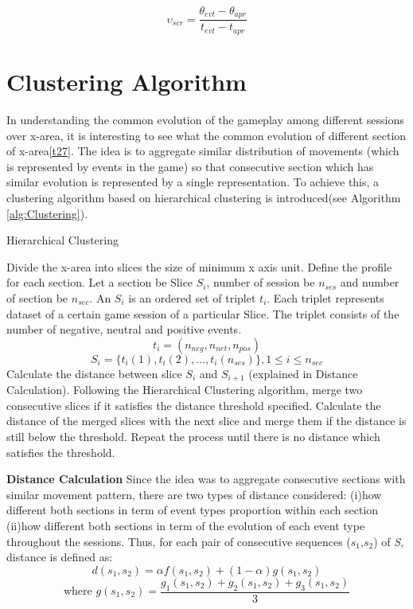 $$ \upsilon_{scr} = \frac{\theta_{evt}-\theta_{apr}}{\textit{t}_{evt}-\textit{t}_{apr}} $$

\section{Clustering Algorithm}

In understanding the common evolution of the gameplay among different sessions over x-area, it is interesting to see what the common evolution of different section of x-area\ref{t27}. The idea is to aggregate similar distribution of movements (which is represented by events in the game) so that consecutive section which has similar evolution is represented by a single representation. To achieve this, a clustering algorithm based on hierarchical clustering is introduced(see Algorithm \ref{alg:Clustering}). 
\begin{algorithm}
  \caption{Hierarchical Clustering}\label{alg:Clustering}
  \begin{algorithmic}[1]
  \STATE Divide the x-area into slices the size of minimum x axis unit.
  \STATE Define the profile for each section. Let a section be Slice $\textit{S}_i$, number of session be $n_{ses}$ and number of section be $n_{sec}$. An $\textit{S}_i$ is an ordered set of triplet $\textit{t}_i$. Each triplet represents dataset of a certain game session of a particular Slice. The triplet consists of the number of negative, neutral and positive events.
$$\textit{t}_i = (n_{neg}, n_{net}, n_{pos})$$
$$\textit{S}_i = \{\textit{t}_i(1), \textit{t}_i(2), ..., \textit{t}_i(n_{ses})\}, 1\le i\le n_{sec}$$
  \STATE Calculate the distance between slice $\textit{S}_i$ and $\textit{S}_{i+1}$ (explained in Distance Calculation).
  \STATE Following the Hierarchical Clustering algorithm\cite{maimon}, merge two consecutive slices if it satisfies the distance threshold specified. Calculate the distance of the merged slices with the next slice and merge them if the distance is still below the threshold. Repeat the process until there is no distance which satisfies the threshold.


  \end{algorithmic}
\end{algorithm}\newline 

\textbf{Distance Calculation}\newline 
Since the idea was to aggregate consecutive sections with similar movement pattern, there are two types of distance considered: (i)how different both sections in term of event types proportion within each section (ii)how different both sections in term of the evolution of each event type throughout the sessions. Thus, for each pair of consecutive sequences ($\textit{s}_1$,$\textit{s}_2$) of \textit{S}, distance is defined as:
$$d(\textit{s}_1,\textit{s}_2) = \alpha\textit{f}(\textit{s}_1,\textit{s}_2) + (1 - \alpha)\textit{g}(\textit{s}_1,\textit{s}_2)$$
$$\text{where } \textit{g}(\textit{s}_1,\textit{s}_2) = \frac{\textit{g}_1(\textit{s}_1,\textit{s}_2) + \textit{g}_2(\textit{s}_1,\textit{s}_2) + \textit{g}_3(\textit{s}_1,\textit{s}_2)}{3}$$

